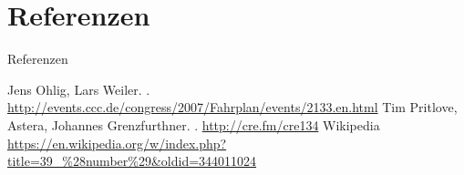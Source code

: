 \documentclass[hyperref={pdfpagelabels=false}]{beamer}
\begin{document}
\section*{Referenzen}

\begin{frame}{Referenzen}
    \begin{thebibliography}{XX}
        \beamertemplatetextbibitems
            Jens Ohlig, Lars Weiler.
            .
            \footnotesize
            \newblock \url{http://events.ccc.de/congress/2007/Fahrplan/events/2133.en.html}
            \normalsize
            Tim Pritlove, Astera, Johannes Grenzfurthner.
            .
            \newblock \url{http://cre.fm/cre134}
            Wikipedia
            \scriptsize
            \newblock \url{https://en.wikipedia.org/w/index.php?title=39\_\%28number\%29\&oldid=344011024}
            \normalsize
    \end{thebibliography}
\end{frame}
\end{document}
